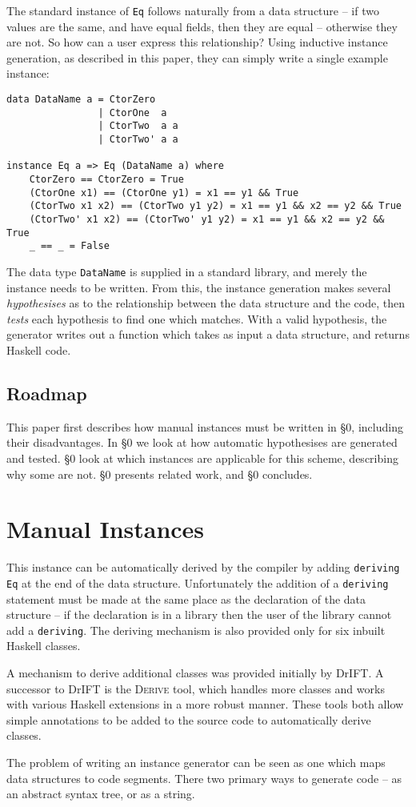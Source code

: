 \documentclass{llncs}
\newcommand{\derive}{\textsc{Derive}}
\newcommand{\T}[1]{\texttt{#1}}
\begin{document}
The standard instance of \T{Eq} follows naturally from a data structure -- if two values are the same, and have equal fields, then they are equal -- otherwise they are not. So how can a user express this relationship? Using inductive instance generation, as described in this paper, they can simply write a single example instance:

\begin{verbatim}
data DataName a = CtorZero
                | CtorOne  a
                | CtorTwo  a a
                | CtorTwo' a a

instance Eq a => Eq (DataName a) where
    CtorZero == CtorZero = True
    (CtorOne x1) == (CtorOne y1) = x1 == y1 && True
    (CtorTwo x1 x2) == (CtorTwo y1 y2) = x1 == y1 && x2 == y2 && True
    (CtorTwo' x1 x2) == (CtorTwo' y1 y2) = x1 == y1 && x2 == y2 && True
    _ == _ = False
\end{verbatim}

The data type \T{DataName} is supplied in a standard library, and merely the instance needs to be written. From this, the instance generation makes several \textit{hypothesises} as to the relationship between the data structure and the code, then \textit{tests} each hypothesis to find one which matches. With a valid hypothesis, the generator writes out a function which takes as input a data structure, and returns Haskell code.

\subsection{Roadmap}

This paper first describes how manual instances must be written in \S0, including their disadvantages. In \S0 we look at how automatic hypothesises are generated and tested. \S0 look at which instances are applicable for this scheme, describing why some are not. \S0 presents related work, and \S0 concludes.


\section{Manual Instances}

This instance can be automatically derived by the compiler by adding \T{deriving Eq} at the end of the data structure. Unfortunately the addition of a \T{deriving} statement must be made at the same place as the declaration of the data structure -- if the declaration is in a library then the user of the library cannot add a \T{deriving}. The deriving mechanism is also provided only for six inbuilt Haskell classes.

A mechanism to derive additional classes was provided initially by DrIFT. A successor to DrIFT is the \derive{} tool, which handles more classes and works with various Haskell extensions in a more robust manner. These tools both allow simple annotations to be added to the source code to automatically derive classes.

The problem of writing an instance generator can be seen as one which maps data structures to code segments. There two primary ways to generate code -- as an abstract syntax tree, or as a string.  
 
\end{document}
